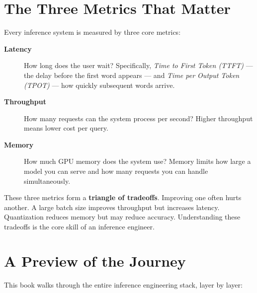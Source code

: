 \documentclass[10pt, oneside, openany]{book}
\newcommand{\keyterm}[1]{\textbf{\color{AccentOrange}#1}}
\begin{document}
\section{The Three Metrics That Matter}

Every inference system is measured by three core metrics:

\begin{description}
  \item[\keyterm{Latency}] How long does the user wait?  Specifically,
    \textit{Time to First Token (TTFT)} --- the delay before the
    first word appears --- and \textit{Time per Output Token (TPOT)}
    --- how quickly subsequent words arrive.
  \item[\keyterm{Throughput}] How many requests can the system process per second?
    Higher throughput means lower cost per query.
  \item[\keyterm{Memory}] How much GPU memory does the system use?  Memory limits
    how large a model you can serve and how many requests you can handle
    simultaneously.
\end{description}

These three metrics form a \textbf{triangle of tradeoffs}.  Improving one often
hurts another.  A large batch size improves throughput but increases latency.
Quantization reduces memory but may reduce accuracy.  Understanding these tradeoffs
is the core skill of an inference engineer.

\section{A Preview of the Journey}

This book walks through the entire inference engineering stack, layer by layer:

\begin{center}
\end{center}
\end{document}
